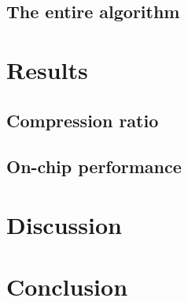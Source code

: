 \documentclass[conference]{IEEEtran}
\begin{document}
  \subsection{The entire algorithm}

  \section{Results}

  \subsection{Compression ratio}

  \subsection{On-chip performance}

  \section{Discussion}

  \section{Conclusion}
\end{document}
